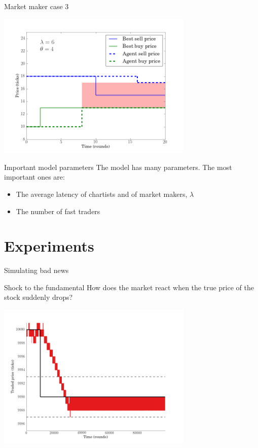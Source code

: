 \documentclass[14pt]{beamer}
\begin{document}
\begin{frame}{Market maker case 3}
\begin{center}
\includegraphics[width=0.7\textwidth]{marketmaker/c.png}
\end{center}
\end{frame}



\begin{frame}{Important model parameters}
The model has many parameters. The most important ones are:
\begin{itemize}
\item The average latency of chartists and of market makers, $\lambda$
\item The number of fast traders
\end{itemize}
\end{frame}

\section{Experiments}
\begin{frame}
\tableofcontents[currentsection]
\end{frame}

\begin{frame}{Simulating bad news}
\begin{block}{Shock to the fundamental}
How does the market react when the true price of the stock suddenly drops?
\end{block}
\end{frame}

\begin{frame}
\begin{center}
\includegraphics[width=0.7\textwidth]{market_cases/a_stable_within_margin.png}
\end{center}
\end{frame}
\end{document}
